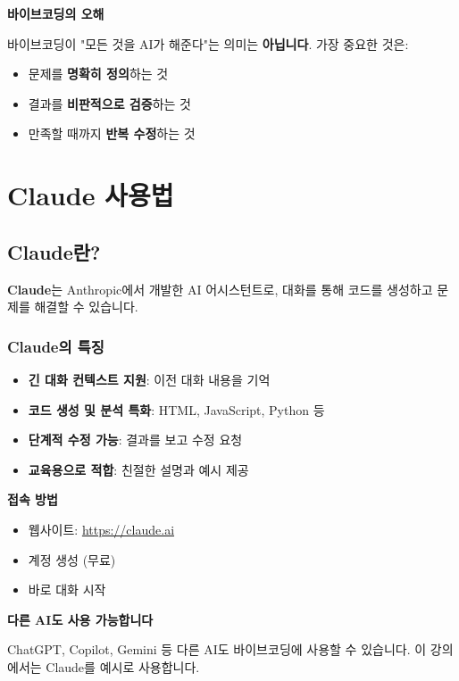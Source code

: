 \documentclass[11pt, a4paper]{article}
\begin{document}
\begin{warning}
\textbf{바이브코딩의 오해}

바이브코딩이 "모든 것을 AI가 해준다"는 의미는 \textbf{아닙니다}. 가장 중요한 것은:
\begin{itemize}
  \item 문제를 \textbf{명확히 정의}하는 것
  \item 결과를 \textbf{비판적으로 검증}하는 것
  \item 만족할 때까지 \textbf{반복 수정}하는 것
\end{itemize}
\end{warning}

\newpage

\section{Claude 사용법}

\subsection{Claude란?}

\textbf{Claude}는 Anthropic에서 개발한 AI 어시스턴트로, 대화를 통해 코드를 생성하고 문제를 해결할 수 있습니다.

\subsubsection{Claude의 특징}

\begin{itemize}
  \item \textbf{긴 대화 컨텍스트 지원}: 이전 대화 내용을 기억
  \item \textbf{코드 생성 및 분석 특화}: HTML, JavaScript, Python 등
  \item \textbf{단계적 수정 가능}: 결과를 보고 수정 요청
  \item \textbf{교육용으로 적합}: 친절한 설명과 예시 제공
\end{itemize}

\textbf{접속 방법}
\begin{itemize}
  \item 웹사이트: \url{https://claude.ai}
  \item 계정 생성 (무료)
  \item 바로 대화 시작
\end{itemize}

\begin{keypoint}
\textbf{다른 AI도 사용 가능합니다}

ChatGPT, Copilot, Gemini 등 다른 AI도 바이브코딩에 사용할 수 있습니다. 이 강의에서는 Claude를 예시로 사용합니다.
\end{keypoint}
\end{document}

